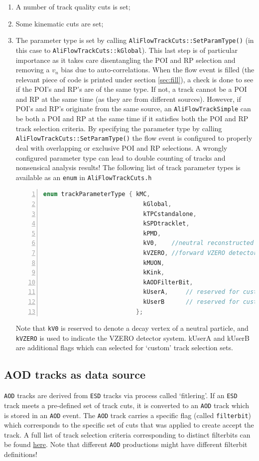 \documentclass[a4paper]{book}
\numberwithin{equation}{subsection}
\begin{document}
\begin{enumerate}
\item A number of track quality cuts is set;
\item Some kinematic cuts are set;
\item The parameter type is set by calling \texttt{AliFlowTrackCuts::SetParamType()} (in this case to \texttt{AliFlowTrackCuts::kGlobal}). This last step is of particular importance as it takes care disentangling the POI and RP selection and removing a $v_n$ bias due to auto-correlations. When the flow event is filled (the relevant piece of code is printed under section \ref{sec:fill}), a check is done to see if the POI's and RP's are of the same type. If not, a track cannot be a POI and RP at the same time (as they are from different sources). However, if POI's and RP's originate from the same source, an \texttt{AliFlowTrackSimple} can be both a POI and RP at the same time if it satisfies both the POI and RP track selection criteria. By specifying the parameter type by calling \texttt{AliFlowTrackCuts::SetParamType()} the flow event is configured to properly deal with overlapping or exclusive POI and RP selections. A wrongly configured parameter type can lead to double counting of tracks and nonsensical analysis results! The following list of track parameter types is available as an \texttt{enum} in \texttt{AliFlowTrackCuts.h}
\begin{lstlisting}[language=C, numbers=left]
  enum trackParameterType { kMC, 
                            kGlobal, 
                            kTPCstandalone, 
                            kSPDtracklet,
                            kPMD,
                            kV0,    //neutral reconstructed v0 particle
                            kVZERO, //forward VZERO detector
                            kMUON,
                            kKink,
                            kAODFilterBit,
                            kUserA,     // reserved for custom cuts
                            kUserB      // reserved for custom cuts
                          };\end{lstlisting}
Note that \texttt{kV0} is reserved to denote a decay vertex of a neutral particle, and \texttt{kVZERO} is used to indicate the VZERO detector system. kUserA and kUserB are additional flags which can selected for `custom' track selection sets.
\end{enumerate}

\subsection{AOD tracks as data source}
\texttt{AOD} tracks are derived from \texttt{ESD} tracks via process called `fitlering'. If an \texttt{ESD} track meets a pre-defined set of track cuts, it is converted to an \texttt{AOD} track which is stored in an \texttt{AOD} event. The \texttt{AOD} track carries a specific flag (called \texttt{filterbit}) which corresponds to the specific set of cuts that was applied to create accept the track. A full list of track selection criteria corresponding to distinct filterbits can be found \href{}{here}. Note that different \texttt{AOD} productions might have different filterbit definitions!
\end{document}

